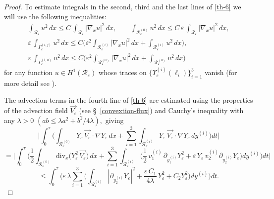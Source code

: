 \documentclass[reqno]{amsart}            %
\numberwithin{equation}{section}
\begin{document}
\begin{proof}
		To estimate integrals in the second, third and the last lines of \eqref{th-6} we will use the following inequalities:
		\begin{gather}\label{m-1}
			\int_{\mathcal{R}_\varepsilon} u^2 \, dx \le C \, \int_{\mathcal{R}_\varepsilon} |\nabla_x u|^2 \, dx, \qquad
			\int_{\mathcal{R}^{(0)}_\varepsilon} u^2 \, dx \le C\, \varepsilon \,  \int_{\mathcal{R}_\varepsilon} |\nabla_x u|^2 \, dx,	
			\\\label{m-2}
			\varepsilon\, \int_{\Gamma^{(i,j)}_\varepsilon} u^2 \, dx \le C \bigg(\varepsilon^2 \int_{\mathcal{R}^{(i)}_\varepsilon} |\nabla_x u|^2 \, dx + \int_{\mathcal{R}^{(i)}_\varepsilon} u^2 \, dx\bigg),
			\\\label{m-3}
			\varepsilon\, \int_{\Gamma^{(i,0)}_\varepsilon} u^2 \, dx \le C \bigg(\varepsilon^2 \int_{\mathcal{R}^{(0)}_\varepsilon} |\nabla_x u|^2 \, dx + \int_{\mathcal{R}^{(0)}_\varepsilon} u^2 \, dx\bigg)
		\end{gather}   
		for any function $u \in H^1(\mathcal{R}_\varepsilon)$ whose traces on $\{\Upsilon_\varepsilon^{(i)}(\ell_i)\}_{i=1}^3$ vanish (for more detail see \cite[Sect.2]{Mel-AA-2021}). 
		
		The advection terms in the fourth line of \eqref{th-6} are estimated using the properties of the advection field $\overrightarrow{V_\varepsilon}$ (see \S~\ref{convextion-flux}) and Cauchy’s inequality with any $\lambda > 0$ $(ab \le \lambda a^2 + b^2/4\lambda),$ giving
		$$
			\bigg|\int_{0}^{\tau} \bigg(\int_{\mathcal{R}^{(0)}_\varepsilon} Y_\varepsilon\,
			\overrightarrow{V_\varepsilon} \cdot
			{\nabla Y_\varepsilon} \, dx + \sum_{i=1}^{3}\int_{\mathcal{R}^{(i)}_\varepsilon} Y_\varepsilon\,
			\overrightarrow{V_\varepsilon} \cdot
			{\nabla Y_\varepsilon} \, dy^{(i)}\bigg) dt\bigg|
		$$
		$$
			=	\bigg|\int_{0}^{\tau} \bigg(\frac12\int_{\mathcal{R}^{(0)}_\varepsilon}\mathrm{div}_x\big(Y^2_\varepsilon\, \overrightarrow{V_\varepsilon}\big)\, dx + \sum_{i=1}^{3}\int_{\mathcal{R}^{(i)}_\varepsilon}\Big(\frac12\, v^{(i)}_1 \, \partial_{y_1^{(i)}}Y_\varepsilon^2  + \varepsilon \, Y_\varepsilon \, v^{(i)}_2 \partial_{y_2^{(i)}}Y_\varepsilon\Big) dy^{(i)}\bigg) dt\bigg|
		$$
		$$
			\le \int_{0}^{\tau} \bigg(\varepsilon\, \lambda \sum_{i=1}^{3}\Big(\int_{\mathcal{R}^{(i)}_\varepsilon} |\partial_{y_2^{(i)}}Y_\varepsilon|^2  + 
			\frac{\varepsilon \, C_1}{4 \lambda} \, Y_\varepsilon^2 + C_2 Y_\varepsilon^2\Big) dy^{(i)}\bigg) dt.
		$$
		

\end{proof}
\end{document}
